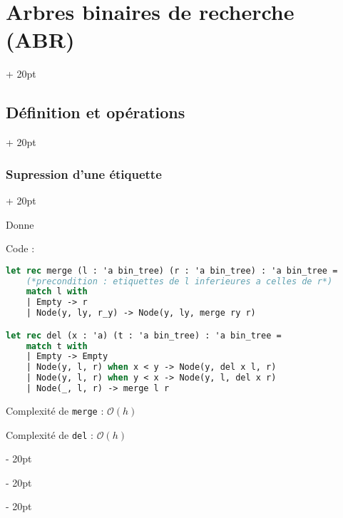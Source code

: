\documentclass[a4paper, 12pt, twoside]{article}
\newcommand{\ind}[1][20pt]{\advance\leftskip + #1}
\newcommand{\deind}[1][20pt]{\advance\leftskip - #1}
\newenvironment{indt}[2][20pt]{#2 \par \ind[#1]}{\par \deind} %
\begin{document}
\begin{indt}{\section{Arbres binaires de recherche (ABR)}}
\begin{indt}{\subsection{Définition et opérations}}
\begin{indt}{\subsubsection{Supression d'une étiquette}}
                \begin{center}
                \end{center}
                
                Donne
                
                \begin{center}
                \end{center}
                
                Code :
                
                \begin{lstlisting}[language=Caml, xleftmargin=80pt]
let rec merge (l : 'a bin_tree) (r : 'a bin_tree) : 'a bin_tree =
    (*precondition : etiquettes de l inferieures a celles de r*)
    match l with
    | Empty -> r
    | Node(y, ly, r_y) -> Node(y, ly, merge ry r)

let rec del (x : 'a) (t : 'a bin_tree) : 'a bin_tree =
    match t with
    | Empty -> Empty
    | Node(y, l, r) when x < y -> Node(y, del x l, r)
    | Node(y, l, r) when y < x -> Node(y, l, del x r)
    | Node(_, l, r) -> merge l r
                \end{lstlisting}
                
                Complexité de \texttt{merge} : $\mathcal O(h)$
                
                Complexité de \texttt{del} : $\mathcal O(h)$
                

\end{indt}
\end{indt}
\end{indt}
\end{document}
